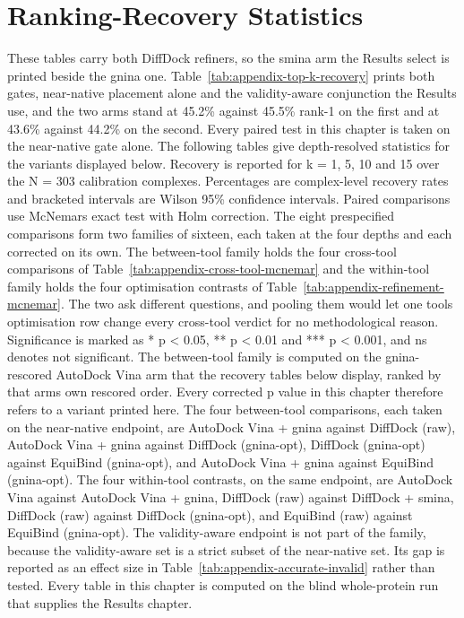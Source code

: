 \hypertarget{ranking-recovery-statistics}{%
\chapter{Ranking-Recovery Statistics}\label{ranking-recovery-statistics}}

These tables carry both DiffDock refiners, so the smina arm the Results select is printed beside the gnina one. Table~\ref{tab:appendix-top-k-recovery} prints both gates, near-native placement alone and the validity-aware conjunction the Results use, and the two arms stand at 45.2\% against 45.5\% rank-1 on the first and at 43.6\% against 44.2\% on the second. Every paired test in this chapter is taken on the near-native gate alone. The following tables give depth-resolved statistics for the variants displayed below. Recovery is reported for k = 1, 5, 10 and 15 over the N = 303 calibration complexes. Percentages are complex-level recovery rates and bracketed intervals are Wilson 95\% confidence intervals. Paired comparisons use McNemar\textquotesingle s exact test with Holm correction. The eight prespecified comparisons form two families of sixteen, each taken at the four depths and each corrected on its own. The between-tool family holds the four cross-tool comparisons of Table~\ref{tab:appendix-cross-tool-mcnemar} and the within-tool family holds the four optimisation contrasts of Table~\ref{tab:appendix-refinement-mcnemar}. The two ask different questions, and pooling them would let one tool\textquotesingle s optimisation row change every cross-tool verdict for no methodological reason. Significance is marked as * p \textless{} 0.05, ** p \textless{} 0.01 and *** p \textless{} 0.001, and ns denotes not significant. The between-tool family is computed on the gnina-rescored AutoDock Vina arm that the recovery tables below display, ranked by that arm\textquotesingle s own rescored order. Every corrected p value in this chapter therefore refers to a variant printed here. The four between-tool comparisons, each taken on the near-native endpoint, are AutoDock Vina + gnina against DiffDock (raw), AutoDock Vina + gnina against DiffDock (gnina-opt), DiffDock (gnina-opt) against EquiBind (gnina-opt), and AutoDock Vina + gnina against EquiBind (gnina-opt). The four within-tool contrasts, on the same endpoint, are AutoDock Vina against AutoDock Vina + gnina, DiffDock (raw) against DiffDock + smina, DiffDock (raw) against DiffDock (gnina-opt), and EquiBind (raw) against EquiBind (gnina-opt). The validity-aware endpoint is not part of the family, because the validity-aware set is a strict subset of the near-native set. Its gap is reported as an effect size in Table~\ref{tab:appendix-accurate-invalid} rather than tested. Every table in this chapter is computed on the blind whole-protein run that supplies the Results chapter.

